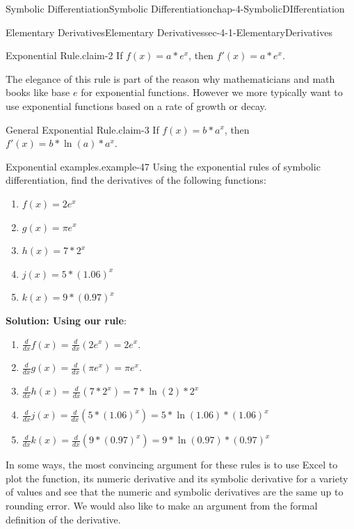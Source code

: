 \documentclass[oneside,10pt,]{book}
\newcommand{\terminology}[1]{\textbf{#1}}
\numberwithin{equation}{section}
\begin{document}
\begin{chapterptx}{Symbolic Differentiation}{}{Symbolic Differentiation}{}{}{chap-4-SymbolicDIfferentiation}
\begin{sectionptx}{Elementary Derivatives}{}{Elementary Derivatives}{}{}{sec-4-1-ElementaryDerivatives}
\begin{claim}{Exponential Rule.}{}{claim-2}
\hypertarget{p-1450}{}%
If \(f(x)=a*e^x\), then \(f'(x)=a*e^x\).%
\end{claim}
\hypertarget{p-1451}{}%
The elegance of this rule is part of the reason why mathematicians and math books like base \(e\) for exponential functions.  However we more typically want to use exponential functions based on a rate of growth or decay.%
\begin{claim}{General Exponential Rule.}{}{claim-3}%
\hypertarget{p-1452}{}%
If \(f(x)=b*a^x\), then \(f'(x)=b*\ln(a)*a^x\).%
\end{claim}
\begin{example}{Exponential examples.}{example-47}%
\hypertarget{p-1453}{}%
Using the exponential rules of symbolic differentiation, find the derivatives of the following functions:%
\leavevmode%
\begin{enumerate}[label=(\alph*)]
\item\hypertarget{li-459}{}\(f(x)=2 e^x\)%
\item\hypertarget{li-460}{}\(g(x)=\pi e^x\)%
\item\hypertarget{li-461}{}\(h(x)=7*2^x\)%
\item\hypertarget{li-462}{}\(j(x)=5*(1.06)^x\)%
\item\hypertarget{li-463}{}\(k(x)=9*(0.97)^x\)%
\end{enumerate}
\hypertarget{p-1454}{}%
\terminology{Solution: Using our rule}:%
\leavevmode%
\begin{enumerate}[label=(\alph*)]
\item\hypertarget{li-464}{}\(\frac{d}{dx} f(x)=  \frac{d}{dx} (2 e^x)=2 e^x.\)%
\item\hypertarget{li-465}{}\(\frac{d}{dx} g(x)=\frac{d}{dx}  (\pi e^x )=\pi e^x.\)%
\item\hypertarget{li-466}{}\(\frac{d}{dx} h(x)=\frac{d}{dx} (7*2^x )=7*\ln(2)*2^x\)%
\item\hypertarget{li-467}{}\(\frac{d}{dx} j(x)=\frac{d}{dx}  (5*(1.06)^x) =5*\ln(1.06)*(1.06)^x \)%
\item\hypertarget{li-468}{}\(\frac{d}{dx}  k(x)=\frac{d}{dx}  (9*(0.97)^x) =9*\ln(0.97)*(0.97)^x \)%
\end{enumerate}
\end{example}
\hypertarget{p-1455}{}%
In some ways, the most convincing argument for these rules is to use Excel to plot the function, its numeric derivative and its symbolic derivative for a variety of values and see that the numeric and symbolic derivatives are the same up to rounding error.  We would also like to make an argument from the formal definition of the derivative.%

\end{sectionptx}
\end{chapterptx}
\end{document}
